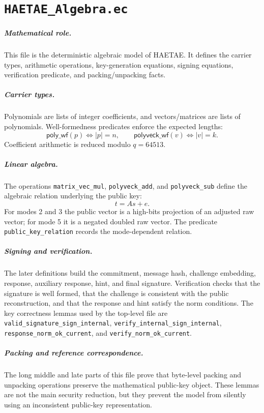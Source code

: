 \documentclass[11pt]{report}
\newcommand{\ec}[1]{\nolinkurl{#1}}
\newcommand{\ecchapter}[2]{\chapter{\texorpdfstring{\texttt{#1}}{#2}}}
\theoremstyle{definition}
\theoremstyle{plain}
\theoremstyle{definition}
\begin{document}
\ecchapter{HAETAE\_Algebra.ec}{HAETAE Algebra.ec}

\paragraph{Mathematical role.}
This file is the deterministic algebraic model of HAETAE.  It defines the
carrier types, arithmetic operations, key-generation equations, signing
equations, verification predicate, and packing/unpacking facts.

\paragraph{Carrier types.}
Polynomials are lists of integer coefficients, and vectors/matrices are lists
of polynomials.  Well-formedness predicates enforce the expected lengths:
\[
  \mathsf{poly\_wf}(p)\Longleftrightarrow |p|=n,\qquad
  \mathsf{polyveck\_wf}(v)\Longleftrightarrow |v|=k.
\]
Coefficient arithmetic is reduced modulo \(q=64513\).

\paragraph{Linear algebra.}
The operations \ec{matrix_vec_mul}, \ec{polyveck_add}, and
\ec{polyveck_sub} define the algebraic relation underlying the public key:
\[
  t = A s + e.
\]
For modes 2 and 3 the public vector is a high-bits projection of an adjusted
raw vector; for mode 5 it is a negated doubled raw vector.  The predicate
\ec{public_key_relation} records the mode-dependent relation.

\paragraph{Signing and verification.}
The later definitions build the commitment, message hash, challenge embedding,
response, auxiliary response, hint, and final signature.  Verification checks
that the signature is well formed, that the challenge is consistent with the
public reconstruction, and that the response and hint satisfy the norm
conditions.  The key correctness lemmas used by the top-level file are
\ec{valid_signature_sign_internal}, \ec{verify_internal_sign_internal},
\ec{response_norm_ok_current}, and \ec{verify_norm_ok_current}.

\paragraph{Packing and reference correspondence.}
The long middle and late parts of this file prove that byte-level packing and
unpacking operations preserve the mathematical public-key object.  These lemmas
are not the main security reduction, but they prevent the model from silently
using an inconsistent public-key representation.
\end{document}
